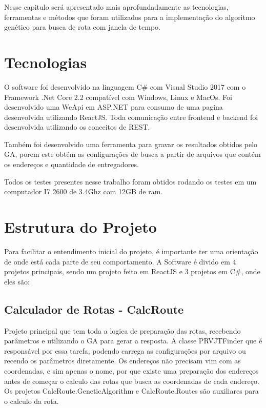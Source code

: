 Nesse capitulo será apresentado mais aprofundadamente as tecnologias, ferramentas e métodos que foram utilizados para a implementação do algoritmo genético para busca de rota com janela de tempo.

\section{Tecnologias}

O software foi desenvolvido na linguagem C\# com Visual Studio 2017 com o Framework  .Net Core 2.2 compatível com Windows, Linux e MacOs.
Foi desenvolvido uma WeApi em ASP.NET para consumo de uma pagina desenvolvida utilizando  ReactJS. Toda comunicação entre frontend e backend foi desenvolvida utilizando os conceitos de REST.

Também foi desenvolvido uma ferramenta para gravar os resultados obtidos pelo GA, porem este obtém as configurações de busca a partir de arquivos que contém os endereços e quantidade de entregadores.

Todos os testes presentes nesse trabalho foram obtidos rodando os testes em um computador I7 2600 de 3.4Ghz com 12GB de ram.


\section{Estrutura do Projeto}

Para facilitar o entendimento inicial do projeto, é importante ter uma orientação de onde está cada parte de seu comportamento. A Software é divido em 4 projetos principais, sendo um projeto feito em ReactJS e 3  projetos em C\#, onde eles são:

\subsection{Calculador de Rotas - CalcRoute}

Projeto principal que tem toda a logica de preparação das rotas, recebendo parâmetros e utilizando o GA para gerar a resposta.
A classe PRVJTFinder que é responsável por essa tarefa, podendo carrega as configurações por arquivo ou recendo os parâmetros diretamente. Os endereços não precisam vim com as coordenadas, e sim apenas o nome, por que existe uma preparação dos endereços antes de começar o calculo das rotas que busca as coordenadas de cada endereço. Os projetos CalcRoute.GeneticAlgorithm e CalcRoute.Routes são auxiliares para o calculo da rota.

